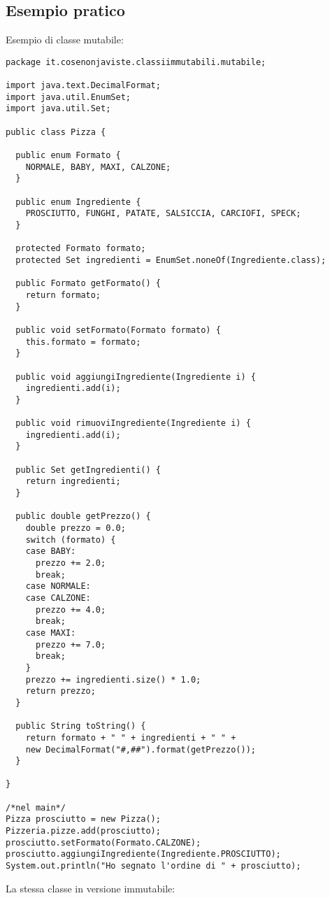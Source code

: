 \subsection{Esempio pratico}
Esempio di classe mutabile:
\begin{lstlisting}
package it.cosenonjaviste.classiimmutabili.mutabile;
 
import java.text.DecimalFormat;
import java.util.EnumSet;
import java.util.Set;
 
public class Pizza {
 
  public enum Formato {
    NORMALE, BABY, MAXI, CALZONE;
  }
 
  public enum Ingrediente {
    PROSCIUTTO, FUNGHI, PATATE, SALSICCIA, CARCIOFI, SPECK;
  }
 
  protected Formato formato;
  protected Set ingredienti = EnumSet.noneOf(Ingrediente.class);
 
  public Formato getFormato() {
    return formato;
  }
 
  public void setFormato(Formato formato) {
    this.formato = formato;
  }
 
  public void aggiungiIngrediente(Ingrediente i) {
    ingredienti.add(i);
  }
 
  public void rimuoviIngrediente(Ingrediente i) {
    ingredienti.add(i);
  }
 
  public Set getIngredienti() {
    return ingredienti;
  }
 
  public double getPrezzo() {
    double prezzo = 0.0;
    switch (formato) {
    case BABY:
      prezzo += 2.0;
      break;
    case NORMALE:
    case CALZONE:
      prezzo += 4.0;
      break;
    case MAXI:
      prezzo += 7.0;
      break;
    }
    prezzo += ingredienti.size() * 1.0;
    return prezzo;
  }
 
  public String toString() {
    return formato + " " + ingredienti + " " + 
    new DecimalFormat("#,##").format(getPrezzo());
  }
 
}

/*nel main*/
Pizza prosciutto = new Pizza();
Pizzeria.pizze.add(prosciutto);
prosciutto.setFormato(Formato.CALZONE);
prosciutto.aggiungiIngrediente(Ingrediente.PROSCIUTTO);
System.out.println("Ho segnato l'ordine di " + prosciutto);
\end{lstlisting}
La stessa classe in versione immutabile:
